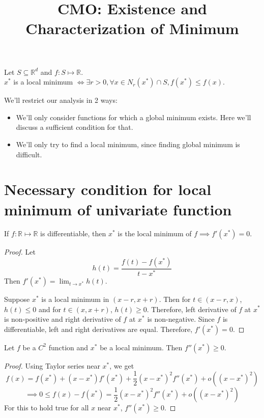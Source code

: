 


\title{CMO: Existence and Characterization of Minimum}



\maketitle
\initMinimal{}

Let $S \subseteq \mathbb{R}^d$ and $f: S \mapsto \mathbb{R}$.
\\ $x^*$ is a local minimum $\iff \exists r > 0, \forall x \in N_r(x^*) \cap S, f(x^*) \le f(x)$.

We'll restrict our analysis in 2 ways:
\begin{itemize}
\item We'll only consider functions for which a global minimum exists.
Here we'll discuss a sufficient condition for that.
\item We'll only try to find a local minimum, since finding global minimum is difficult.
\end{itemize}

\section{Necessary condition for local minimum of univariate function}

\begin{theorem}
If $f: \mathbb{R} \mapsto \mathbb{R}$ is differentiable,
then $x^*$ is the local minimum of $f \implies f'(x^*) = 0$.
\end{theorem}
\begin{proof}
Let
\[ h(t) = \frac{f(t) - f(x^*)}{t - x^*} \]
Then $f'(x^*) = \lim_{t \rightarrow x^*} h(t)$.

Suppose $x^*$ is a local minimum in $(x-r, x+r)$.
Then for $t \in (x-r, x)$, $h(t) \le 0$ and for $t \in (x, x+r)$, $h(t) \ge 0$.
Therefore, left derivative of $f$ at $x^*$ is non-positive
and right derivative of $f$ at $x^*$ is non-negative.
Since $f$ is differentiable, left and right derivatives are equal.
Therefore, $f'(x^*) = 0$.
\end{proof}

\begin{theorem} Let $f$ be a $C^2$ function and $x^*$ be a local minimum.
Then $f''(x^*) \ge 0$. \end{theorem}
\begin{proof}
Using Taylor series near $x^*$, we get
\[ f(x) = f(x^*) + (x-x^*)f'(x^*) + \frac{1}{2}(x-x^*)^2f''(x^*) + o((x-x^*)^2) \]
\[ \implies 0 \le f(x) - f(x^*) = \frac{1}{2}(x-x^*)^2f''(x^*) + o((x-x^*)^2) \]
For this to hold true for all $x$ near $x^*$, $f''(x^*) \ge 0$.
\end{proof}

